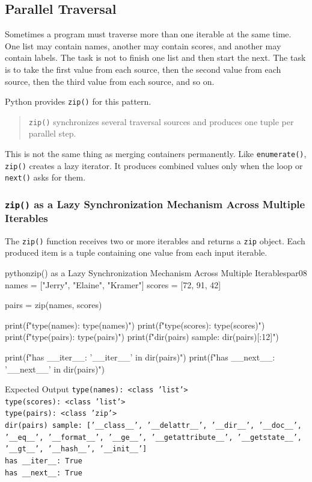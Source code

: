 \documentclass[a4paper,twoside]{report}
\begin{document}
\subsection{Parallel Traversal}

Sometimes a program must traverse more than one iterable at the same time. One list may contain names, another may contain scores, and another may contain labels. The task is not to finish one list and then start the next. The task is to take the first value from each source, then the second value from each source, then the third value from each source, and so on.

Python provides \texttt{zip()} for this pattern.

\begin{quote}
\texttt{zip()} synchronizes several traversal sources and produces one tuple per parallel step.
\end{quote}

This is not the same thing as merging containers permanently. Like \texttt{enumerate()}, \texttt{zip()} creates a lazy iterator. It produces combined values only when the loop or \texttt{next()} asks for them.

\subsubsection{\texttt{zip()} as a Lazy Synchronization Mechanism Across Multiple Iterables}

The \texttt{zip()} function receives two or more iterables and returns a \texttt{zip} object. Each produced item is a tuple containing one value from each input iterable.

\begin{codebox}[]{python}{zip() as a Lazy Synchronization Mechanism Across Multiple Iterables}{par08}
names = ["Jerry", "Elaine", "Kramer"]
scores = [72, 91, 42]

pairs = zip(names, scores)

print(f"type(names): {type(names)}")
print(f"type(scores): {type(scores)}")
print(f"type(pairs): {type(pairs)}")
print(f"dir(pairs) sample: {dir(pairs)[:12]}")

print(f"has __iter__: {'__iter__' in dir(pairs)}")
print(f"has __next__: {'__next__' in dir(pairs)}")
\end{codebox}


\begin{iobox}{Expected Output}
\texttt{type(names): <class 'list'>} \\
\texttt{type(scores): <class 'list'>} \\
\texttt{type(pairs): <class 'zip'>} \\
\texttt{dir(pairs) sample: ['\_\_class\_\_', '\_\_delattr\_\_', '\_\_dir\_\_', '\_\_doc\_\_',} \\
\texttt{'\_\_eq\_\_', '\_\_format\_\_', '\_\_ge\_\_', '\_\_getattribute\_\_', '\_\_getstate\_\_',} \\
\texttt{'\_\_gt\_\_', '\_\_hash\_\_', '\_\_init\_\_']} \\
\texttt{has \_\_iter\_\_: True} \\
\texttt{has \_\_next\_\_: True} \\
\end{iobox}
\end{document}

